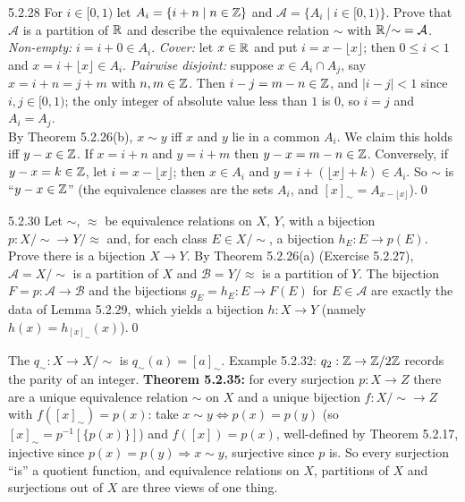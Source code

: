 \begin{bookex}[recommended]{5.2.28}
For $i\in[0,1)$ let $A_i=\{i+n\mid n\in\mathbb{Z}\}$ and $\mathcal A=\{A_i\mid i\in[0,1)\}$. Prove that $\mathcal A$ is a partition of $\mathbb{R}$ and describe the equivalence relation $\sim$ with $\mathbb{R}/{\sim}=\mathcal A$.
\solution
\emph{Non-empty:} $i=i+0\in A_i$. \emph{Cover:} let $x\in\mathbb{R}$ and put $i=x-\lfloor x\rfloor$; then $0\le i<1$ and $x=i+\lfloor x\rfloor\in A_i$. \emph{Pairwise disjoint:} suppose $x\in A_i\cap A_j$, say $x=i+n=j+m$ with $n,m\in\mathbb{Z}$. Then $i-j=m-n\in\mathbb{Z}$, and $|i-j|<1$ since $i,j\in[0,1)$; the only integer of absolute value less than $1$ is $0$, so $i=j$ and $A_i=A_j$.\\
By Theorem 5.2.26(b), $x\sim y$ iff $x$ and $y$ lie in a common $A_i$. We claim this holds iff $y-x\in\mathbb{Z}$. If $x=i+n$ and $y=i+m$ then $y-x=m-n\in\mathbb{Z}$. Conversely, if $y-x=k\in\mathbb{Z}$, let $i=x-\lfloor x\rfloor$; then $x\in A_i$ and $y=i+(\lfloor x\rfloor+k)\in A_i$. So $\sim$ is ``$y-x\in\mathbb{Z}$'' (the equivalence classes are the sets $A_i$, and $[x]_\sim=A_{x-\lfloor x\rfloor}$).\qed
\end{bookex}

\begin{bookex}[recommended]{5.2.30}
Let $\sim$, $\approx$ be equivalence relations on $X$, $Y$, with a bijection $p:X/{\sim}\to Y/{\approx}$ and, for each class $E\in X/{\sim}$, a bijection $h_E:E\to p(E)$. Prove there is a bijection $X\to Y$.
\solution
By Theorem 5.2.26(a) (Exercise 5.2.27), $\mathcal A=X/{\sim}$ is a partition of $X$ and $\mathcal B=Y/{\approx}$ is a partition of $Y$. The bijection $F=p:\mathcal A\to\mathcal B$ and the bijections $g_E=h_E:E\to F(E)$ for $E\in\mathcal A$ are exactly the data of Lemma 5.2.29, which yields a bijection $h:X\to Y$ (namely $h(x)=h_{[x]_\sim}(x)$).\qed
\end{bookex}

\begin{key}
The  $q_\sim:X\to X/{\sim}$ is $q_\sim(a)=[a]_\sim$. Example 5.2.32: $q_2:\mathbb{Z}\to\mathbb{Z}/2\mathbb{Z}$ records the parity of an integer. \textbf{Theorem 5.2.35:} for every surjection $p:X\to Z$ there are a unique equivalence relation $\sim$ on $X$ and a unique bijection $f:X/{\sim}\to Z$ with $f([x]_\sim)=p(x)$: take $x\sim y\Leftrightarrow p(x)=p(y)$ (so $[x]_\sim=p^{-1}[\{p(x)\}]$) and $f([x])=p(x)$, well-defined by Theorem 5.2.17, injective since $p(x)=p(y)\Rightarrow x\sim y$, surjective since $p$ is. So every surjection ``is'' a quotient function, and equivalence relations on $X$, partitions of $X$ and surjections out of $X$ are three views of one thing.
\end{key}

